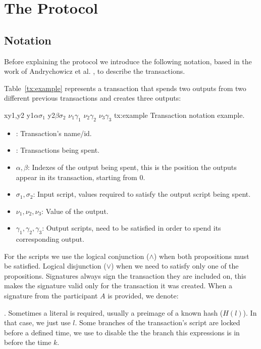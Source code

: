 \section{The Protocol}
\subsection{Notation}
Before explaining the protocol we introduce the following notation, based
  in the work of Andrychowicz et al. \cite{andrychowicz2014secure}, to describe
  the transactions.

Table~\ref{tx:example} represents a transaction that spends two outputs from
  two different previous transactions and creates three outputs:

  \transaction
    {x}{y1,y2}
      {y1}{$\alpha$}{$\sigma_1$}
      {y2}{$\beta$}{$\sigma_2$}
      \stopinputs
      {$\nu_1$}{$\gamma_1$}
      {$\nu_2$}{$\gamma_2$}
      {$\nu_3$}{$\gamma_3$}
      \stopoutputs
      {tx:example}
      {Transaction notation example.}

\begin{itemize}
    \item {}: Transaction's name/id.
    \item {}: Transactions being spent.
    \item $\alpha,\beta$: Indexes of the output being spent, this is the
                            position the outputs appear in its transaction,
                            starting from 0.
    \item $\sigma_1,\sigma_2$: Input script, values required to satisfy the
                                output script being spent.
    \item $\nu_1,\nu_2,\nu_3$: Value of the output.
    \item $\gamma_1, \gamma_2, \gamma_3$: Output scripts, need to be satisfied
                                          in order to spend its corresponding
                                          output.
\end{itemize}

For the scripts we use the logical conjunction ($\wedge$) when both propositions
  must be satisfied.
Logical disjunction ($\vee$) when we need to satisfy only one of the
  propositions.
Signatures always sign the transaction they are included on, this makes the
  signature valid only for the transaction it was created.
When a signature from the participant $A$ is provided, we denote: \signature{A}.
Sometimes a literal is required, usually a preimage of a known hash ($H(l)$).
In that case, we just use $l$.
Some branches of the transaction's script are locked before a defined time, we
  use  to disable the the branch this expressions is in before the
  time $k$.

